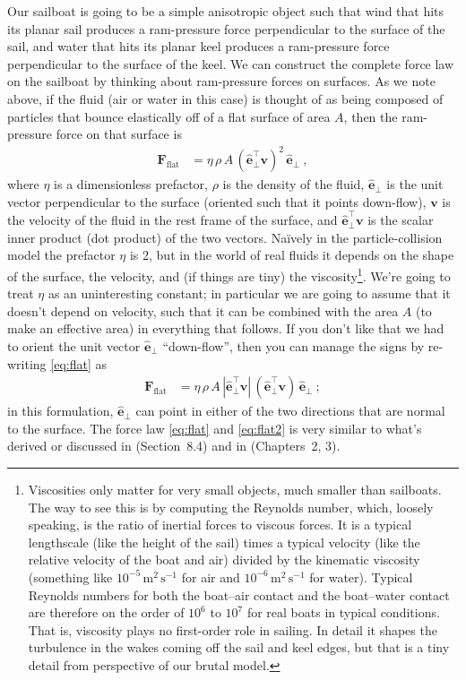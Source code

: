 \documentclass[letterpaper]{article}
\renewcommand{\vec}[1]{\boldsymbol{#1}}
\newcommand{\uvec}{\vec{\hat{e}}}
\renewcommand{\flat}{\text{flat}}
\newcommand{\mmps}{\mathrm{m^2\,s^{-1}}}
\begin{document}
Our sailboat is going to be a simple anisotropic object such that wind that hits its planar sail produces a ram-pressure force perpendicular to the surface of the sail,
and water that hits its planar keel produces a ram-pressure force perpendicular to the surface of the keel.
We can construct the complete force law on the sailboat by thinking about ram-pressure forces on surfaces.
As we note above, if the fluid (air or water in this case) is thought of as being composed of particles that bounce elastically off of a flat surface of area $A$, then the ram-pressure force on that surface is
\begin{align}\label{eq:flat}
    \vec{F}_\flat &= \eta\,\rho\,A\,(\uvec_\perp^\top\vec{v})^2\,\uvec_\perp ~,
\end{align}
where $\eta$ is a dimensionless prefactor, $\rho$ is the density of the fluid, $\uvec_\perp$ is the unit vector perpendicular to the surface (oriented such that it points down-flow), $\vec{v}$ is the velocity of the fluid in the rest frame of the surface, and $\uvec_\perp^\top\vec{v}$ is the scalar inner product (dot product) of the two vectors.
Na\"ively in the particle-collision model the prefactor $\eta$ is 2, but in the world of real fluids it depends on the shape of the surface, the velocity, and (if things are tiny) the viscosity\footnote{%
Viscosities only matter for very small objects, much smaller than sailboats. The way to see this is by computing the Reynolds number, which, loosely speaking, is the ratio of inertial forces to viscous forces. It is a typical lengthscale (like the height of the sail) times a typical velocity (like the relative velocity of the boat and air) divided by the kinematic viscosity (something like $10^{-5}\,\mmps$ for air and $10^{-6}\,\mmps$ for water). Typical Reynolds numbers for both the boat--air contact and the boat--water contact are therefore on the order of $10^6$ to $10^7$ for real boats in typical conditions. That is, viscosity plays no first-order role in sailing. In detail it shapes the turbulence in the wakes coming off the sail and keel edges, but that is a tiny detail from perspective of our brutal model.}.
We're going to treat $\eta$ as an uninteresting constant; in particular we are going to assume that it doesn't depend on velocity, such that it can be combined with the area $A$ (to make an effective area) in everything that follows.
If you don't like that we had to orient the unit vector $\uvec_\perp$ ``down-flow'', then you can manage the signs by re-writing \eqref{eq:flat} as
\begin{align}\label{eq:flat2}
    \vec{F}_\flat &= \eta\,\rho\,A\,|\uvec_\perp^\top\vec{v}|\,(\uvec_\perp^\top\vec{v})\,\uvec_\perp ~;
\end{align}
in this formulation, $\uvec_\perp$ can point in either of the two directions that are normal to the surface.
The force law \eqref{eq:flat} and \eqref{eq:flat2} is very similar to what's derived or discussed in \cite{symmetry} (Section~8.4) and in \cite{pos} (Chapters~2, 3).
\end{document}
